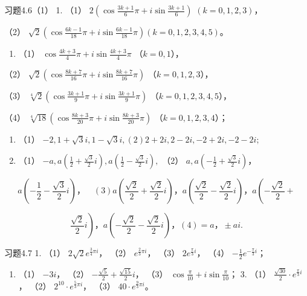 习题4.6（1） 1. （1）
\(2\left(\cos \frac{3k + 1}{6}\pi + i\sin \frac{3k + 1}{6}\right)\)
\((k = 0,1,2,3)\)，

（2）
\(\sqrt{2}\left(\cos \frac{6k - 1}{18}\pi + i\sin \frac{6k - 1}{18}\pi\right) (k = 0, 1, 2, 3, 4, 5)\)。

\begin{enumerate}[start=2]
\item
  （1） \(\cos \frac{4k + 3}{4}\pi + i\sin \frac{4k + 3}{4}\pi\)
  （\(k = 0, 1\)），
\end{enumerate}

（2）
\(\sqrt{2}\left(\cos \frac{8k + 7}{16}\pi + i\sin \frac{8k + 7}{16}\pi\right)\)
（\(k = 0, 1, 2, 3\)），

（3）
\(\sqrt[4]{2}\left(\cos \frac{3k + 1}{9}\pi + i\sin \frac{3k + 1}{9}\pi\right)\)
（\(k = 0, 1, 2, 3, 4, 5\)），

（4）
\(\sqrt[4]{18}\left(\cos \frac{8k + 3}{20}\pi + i\sin \frac{8k + 3}{20}\pi\right)\)
（\(k = 0, 1, 2, 3, 4\)）；

\begin{enumerate}[start=3]
\item
  （1）
  \(-2, 1 + \sqrt{3}i, 1 - \sqrt{3}i, (2) 2 + 2i, 2 - 2i, -2 + 2i, -2 - 2i;\)
\item
  （1）
  \(-a, a\left(\frac{1}{2} + \frac{\sqrt{3}}{2}i\right), a\left(\frac{1}{2} - \frac{\sqrt{3}}{2}i\right),\)
  （2） \(a, a\left(-\frac{1}{2} + \frac{\sqrt{3}}{2}i\right)\)，
\end{enumerate}

\[
a \left(- \frac {1}{2} - \frac {\sqrt {3}}{2} i\right)\text{，} \quad (3) a \left(\frac {\sqrt {2}}{2} + \frac {\sqrt {2}}{2} i\right)\text{，} a \left(\frac {\sqrt {2}}{2} - \frac {\sqrt {2}}{2} i\right)\text{，} a \left(- \frac {\sqrt {2}}{2} + \right.
\]

\[
\left. \frac {\sqrt {2}}{2} i\right)\text{，} a \left(- \frac {\sqrt {2}}{2} - \frac {\sqrt {2}}{2} i\right)\text{，} (4) = a\text{，} \pm a i.
\]

习题4.7 1. （1） \(2\sqrt{2}e^{\frac{3}{4}\pi i}\)， （2）
\(e^{\frac{2}{3}\pi i}\)， （3） \(2e^{\frac{\pi}{3}i}\)， （4）
\(-\frac{1}{2}e^{-\frac{\pi}{3}i}\)；

\begin{enumerate}[start=2]
\item
  （1） \(-3i\)， （2） \(-\frac{\sqrt{5}}{2} + \frac{\sqrt{15}}{2}i\)，
  （3） \(\cos \frac{\pi}{10} + i \sin \frac{\pi}{10}\)； 3. （1）
  \(\frac{\sqrt{30}}{2} \cdot e^{\frac{\pi}{3}i}\)， （2）
  \(2^{10} \cdot e^{\frac{5}{3}\pi i}\)， （3）
  \(40 \cdot e^{\frac{9}{3}\pi i}\)。
\end{enumerate}

